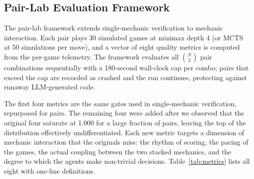 \documentclass[conference]{IEEEtran}
\begin{document}
\subsection{Pair-Lab Evaluation Framework}                    
                                                                                
The pair-lab framework extends single-mechanic verification to mechanic interaction. Each pair plays 30 simulated games at minimax depth 4 (or MCTS at 50 simulations per move), and a vector of eight quality metrics is computed from the per-game telemetry. The framework evaluates all $\binom{N}{2}$ pair combinations sequentially with a 180-second wall-clock cap per combo; pairs that exceed the cap are recorded as crashed and the run continues, protecting against runaway LLM-generated code.                              
   
  The first four metrics are the same gates used in single-mechanic             
  verification, repurposed for pairs. The remaining four were added after we  
  observed that the original four saturate at 1.000 for a large fraction of
  pairs, leaving the top of the distribution effectively undifferentiated. Each
  new metric targets a dimension of mechanic interaction that the originals
  miss: the rhythm of scoring, the pacing of the games, the actual coupling
  between the two stacked mechanics, and the degree to which the agents make
  non-trivial decisions. Table~\ref{tab:metrics} lists all eight with one-line
  definitions.                                                                  
   
\end{document}
